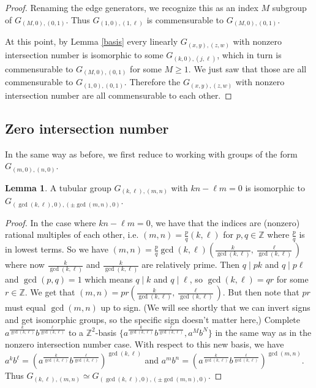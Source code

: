 \documentclass[10pt]{article}
\def\integers{{\mathbb{Z}}}
\theoremstyle{definition}
\newtheorem{lemma}{Lemma}
\begin{document}
\begin{proof}

Renaming the edge generators, we recognize this as an index $M$ subgroup of $G_{(M,0),(0,1)}$. Thus $G_{(1,0),(1,\ell)}$ is commensurable to $G_{(M,0),(0,1)}$. 

At this point, by Lemma \ref{basis} every linearly  $G_{(x,y),(z,w)}$ with nonzero intersection number is isomorphic to some $G_{(k,0),(j,\ell)}$, which in turn is commensurable to $G_{(M,0),(0,1)}$ for some $M\geq 1$.  We just saw that those are all commensurable to $G_{(1,0),(0,1)}$. Therefore the  $G_{(x,y),(z,w)}$ with nonzero intersection number are all commensurable to each other. 
\end{proof}
 

\subsection{Zero intersection number}

In the same way as before, we  first reduce to working with groups of the form $G_{(m,0),(n,0)}$. 

\begin{lemma}
A  tubular group $G_{(k,\ell),(m,n)}$ with $kn-\ell m=0$ is isomorphic to $G_{(\gcd(k,\ell),0),(\pm \gcd(m,n),0)}$. 
\end{lemma}

\begin{proof}
In the  case where $kn-\ell m=0$, we have that the indices are (nonzero) rational multiples of each other, i.e. $(m,n)=\frac{p}{q}(k,\ell)$ for $p,q\in \integers$ where $\frac{p}{q}$ is in lowest terms. So we have $(m,n)=\frac{p}{q}\gcd(k,\ell) (\frac{k}{\gcd(k,\ell)}, \frac{\ell}{\gcd(k,\ell)})$ where now $\frac{k}{\gcd(k,\ell)}$ and $\frac{k}{\gcd(k,\ell)}$ are relatively prime. 
Then $q \mid pk$ and $q\mid p\ell$ and $\gcd(p,q)=1$ which means $q\mid k$ and $q\mid \ell$, so $\gcd(k,\ell)=qr$ for some $r\in \integers$. We get that $(m,n)=pr (\frac{k}{\gcd(k,\ell)}, \frac{\ell}{\gcd(k,\ell)})$. But then note that $pr$ must equal $\gcd(m,n)$ up to sign. (We will see shortly that we can invert signs and get isomorphic groups, so the specific sign doesn't matter here,) Complete $a^{\frac{k}{\gcd(k,\ell)}}b^{\frac{\ell}{\gcd(k,\ell)}}$ to a $\integers^2$-basis $\{a^{\frac{k}{\gcd(k,\ell)}}b^{\frac{\ell}{\gcd(k,\ell)}}, a^M b^N\}$ in the same way as in the nonzero intersection number case. With respect to this new basis, we have $a^k b^\ell = (a^{\frac{k}{\gcd(k,\ell)}}b^{\frac{\ell}{\gcd(k,\ell)}})^{\gcd(k,\ell)}$ and $a^m b^n = (a^{\frac{k}{\gcd(k,\ell)}}b^{\frac{\ell}{\gcd(k,\ell)}})^{\gcd(m,n)}$. Thus $G_{(k,\ell),(m,n)} \simeq G_{(\gcd(k,\ell),0),(\pm \gcd(m,n),0)}$. 
     
\end{proof}
\end{document}
